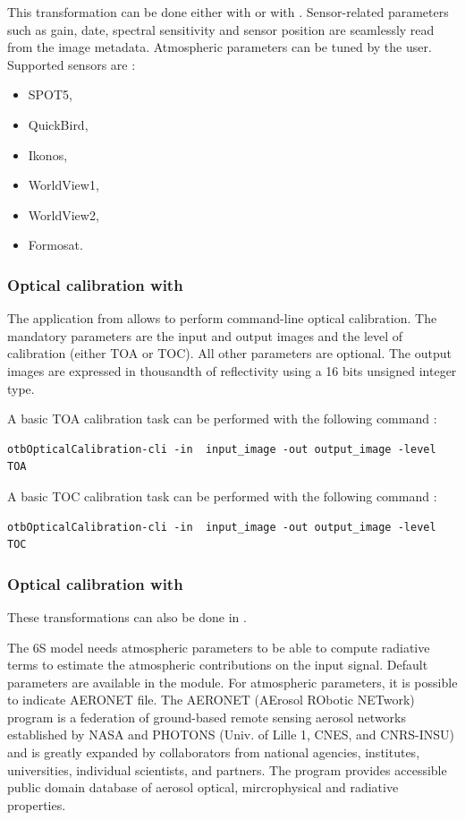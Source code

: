 This transformation can be done either with \app or with
\mont. Sensor-related parameters such as gain, date, spectral
sensitivity and sensor position are seamlessly read from the image
metadata. Atmospheric parameters can be tuned by the user. Supported
sensors are :
\begin{itemize}
\item SPOT5,
\item QuickBird,
\item Ikonos,
\item WorldView1,
\item WorldView2,
\item Formosat.
\end{itemize}

\subsubsection{Optical calibration with \app}

The  application from \app
allows to perform command-line optical calibration. The mandatory
parameters are the input and output images and the level of
calibration (either TOA or TOC). All other parameters are
optional. The output images are expressed in thousandth of
reflectivity using a 16 bits unsigned integer type.

A basic TOA calibration task can be performed with the following command :

\begin{verbatim}
otbOpticalCalibration-cli -in  input_image -out output_image -level TOA
\end{verbatim}

A basic TOC calibration task can be performed with the following command :

\begin{verbatim}
otbOpticalCalibration-cli -in  input_image -out output_image -level TOC
\end{verbatim}

\subsubsection{Optical calibration with \mont}

These transformations can also be done in \mont.

The 6S model needs atmospheric parameters to be able to compute
radiative terms to estimate the atmospheric contributions on the input
signal. Default parameters are available in the module.  For
atmospheric parameters, it is possible to indicate AERONET file. The
AERONET (AErosol RObotic NETwork) program is a federation of
ground-based remote sensing aerosol networks established by NASA and
PHOTONS (Univ. of Lille 1, CNES, and CNRS-INSU) and is greatly
expanded by collaborators from national agencies, institutes,
universities, individual scientists, and partners. The program
provides accessible public domain database of aerosol optical,
mircrophysical and radiative properties.

